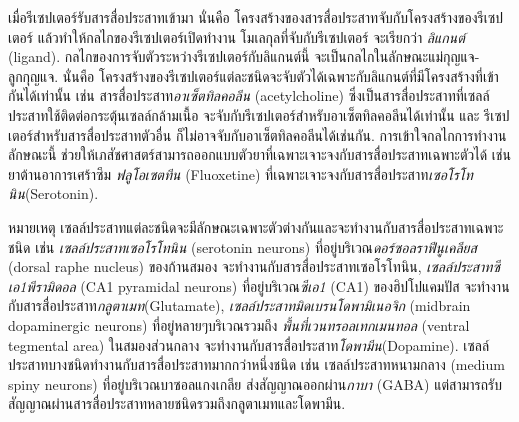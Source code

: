 {\begin{shaded}
เมื่อรีเซปเตอร์รับสารสื่อประสาทเข้ามา
นั่นคือ โครงสร้างของสารสื่อประสาทจับกับโครงสร้างของรีเซปเตอร์
แล้วทำให้กลไกของรีเซปเตอร์เปิดทำงาน
%
โมเลกุลที่จับกับรีเซปเตอร์ จะเรียกว่า \textit{ลิแกนต์} (ligand).
กลไกของการจับตัวระหว่างรีเซปเตอร์กับลิแกนต์นี้
จะเป็นกลไกในลักษณะแม่กุญแจ-ลูกกุญแจ.
นั่นคือ โครงสร้างของรีเซปเตอร์แต่ละชนิดจะจับตัวได้เฉพาะกับลิแกนต์ที่มีโครงสร้างที่เข้ากันได้เท่านั้น
เช่น สารสื่อประสาท\textit{อาเซ็ตทิลคอลีน} (acetylcholine) ซึ่งเป็นสารสื่อประสาทที่เซลล์ประสาทใช้ติดต่อกระตุ้นเซลล์กล้ามเนื้อ
จะจับกับรีเซปเตอร์สำหรับอาเซ็ตทิลคอลีนได้เท่านั้น
และ รีเซปเตอร์สำหรับสารสื่อประสาทตัวอื่น ก็ไม่อาจจับกับอาเซ็ตทิลคอลีนได้เช่นกัน.
การเข้าใจกลไกการทำงานลักษณะนี้ 
ช่วยให้เภสัชศาสตร์สามารถออกแบบตัวยาที่เฉพาะเจาะจงกับสารสื่อประสาทเฉพาะตัวได้
เช่น ยาต้านอาการเศร้าซึม \textit{ฟลูโอเซตทีน} (Fluoxetine) ที่เฉพาะเจาะจงกับสารสื่อประสาท\textit{เซอโรโทนิน}(Serotonin).

หมายเหตุ เซลล์ประสาทแต่ละชนิดจะมีลักษณะเฉพาะตัวต่างกันและจะทำงานกับสารสื่อประสาทเฉพาะชนิด
เช่น
\textit{เซลล์ประสาทเซอโรโทนิน} (serotonin neurons) ที่อยู่บริเวณ\textit{ดอร์ซอลราฟีนูเคลียส} (dorsal raphe nucleus) ของก้านสมอง จะทำงานกับสารสื่อประสาทเซอโรโทนิน\cite{LiEtAl2016a},
\textit{เซลล์ประสาทซีเอ1พีรามิดอล} (CA1 pyramidal neurons) ที่อยู่บริเวณ\textit{ซีเอ1} (CA1) ของฮิปโปแคมปัส
จะทำงานกับสารสื่อประสาท\textit{กลูตาเมท}(Glutamate)\cite{NeuroBank},
\textit{เซลล์ประสาทมิดเบรนโดพามิเนอจิก} (midbrain dopaminergic neurons) ที่อยู่หลายๆบริเวณรวมถึง \textit{พื้นที่เวนทรอลเทกเมนทอล} (ventral tegmental area) ในสมองส่วนกลาง
จะทำงานกับสารสื่อประสาท\textit{โดพามีน}(Dopamine)\cite{NeuroBank}.
เซลล์ประสาทบางชนิดทำงานกับสารสื่อประสาทมากกว่าหนึ่งชนิด เช่น
เซลล์ประสาทหนามกลาง (medium spiny neurons) ที่อยู่บริเวณบาซอลแกงเกลีย
ส่งสัญญาณออกผ่าน\textit{กาบา} (GABA) แต่สามารถรับสัญญาณผ่านสารสื่อประสาทหลายชนิดรวมถึงกลูตาเมทและโดพามีน.

\end{shaded}
}

